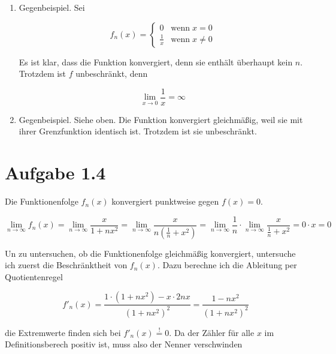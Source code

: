 \documentclass[a4paper,german,12pt,smallheadings]{scrartcl}
\begin{document}
\begin{enumerate}[(1)]
\item Gegenbeispiel. Sei

\begin{equation*}
  f_n(x) = \begin{cases} 
    0           & \mbox{wenn} \; x = 0 \\
    \frac{1}{x} & \mbox{wenn} \; x \neq 0
  \end{cases}
\end{equation*}

Es ist klar, dass die Funktion konvergiert, denn sie enthält überhaupt kein
$n$. Trotzdem ist $f$ unbeschränkt, denn

\begin{equation*}
  \lim_{x \to 0} \frac{1}{x} = \infty
\end{equation*}

\item Gegenbeispiel. Siehe oben. Die Funktion konvergiert gleichmäßig,
  weil sie mit ihrer Grenzfunktion identisch ist. Trotzdem ist sie
  unbeschränkt.

\end{enumerate}

\section*{Aufgabe 1.4}

Die Funktionenfolge $f_n(x)$ konvergiert punktweise gegen $f(x) = 0$.

\begin{equation*}
  \lim_{n \to \infty} f_n(x) = \lim_{n \to \infty} \frac{x}{1+nx^2} = \lim_{n \to \infty} \frac{x}{n \left(\frac{1}{n} + x^2\right)} = \lim_{n \to \infty} \frac{1}{n} \cdot \lim_{n \to \infty} \frac{x}{\frac{1}{n} + x^2} = 0 \cdot x = 0
\end{equation*}

Un zu untersuchen, ob die Funktionenfolge gleichmäßig konvergiert, untersuche ich zuerst die Beschränktheit von $f_n(x)$. Dazu berechne ich die Ableitung per Quotientenregel

\begin{equation*}
  f'_n(x) = \frac{1 \cdot (1+nx^2) - x \cdot 2nx}{(1+nx^2)^2} = \frac{1-nx^2}{(1+nx^2)^2}
\end{equation*}

die Extremwerte finden sich bei $f'_n(x) \overset{!}{=} 0$. Da der Zähler für
alle $x$ im Definitionsberech positiv ist, muss also der Nenner verschwinden
\end{document}
